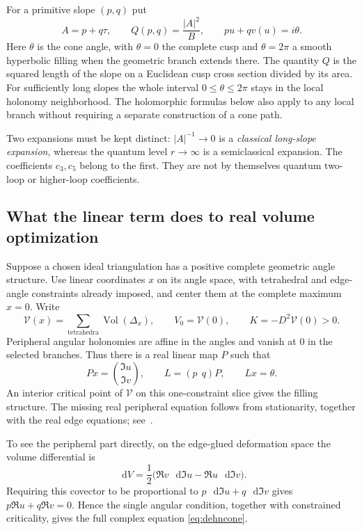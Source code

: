 \documentclass[11pt,a4paper]{article}
\numberwithin{equation}{section}
\theoremstyle{definition}
\theoremstyle{remark}
\DeclareMathOperator{\Vol}{Vol}
\newcommand{\dd}{\mathop{}\!\mathrm d}
\begin{document}
For a primitive slope $(p,q)$ put
\begin{equation}
 A=p+q\tau,\qquad Q(p,q)=\frac{|A|^2}{B},\qquad
 pu+qv(u)=i\theta.
 \label{eq:dehncone}
\end{equation}
Here $\theta$ is the cone angle, with $\theta=0$ the complete cusp
and $\theta=2\pi$ a smooth hyperbolic filling when the geometric
branch extends there. The quantity $Q$ is the squared length of
the slope on a Euclidean cusp cross section divided by its area.
For sufficiently long slopes the whole interval $0\leq\theta\leq2\pi$
stays in the local holonomy neighborhood. The holomorphic formulas
below also apply to any local branch without requiring a separate
construction of a cone path.

Two expansions must be kept distinct: $|A|^{-1}\to0$ is a
\emph{classical long-slope expansion}, whereas the quantum level
$r\to\infty$ is a semiclassical expansion. The coefficients $c_3,c_5$
belong to the first. They are not by themselves quantum two-loop
or higher-loop coefficients.

\subsection{What the linear term does to real volume optimization}

Suppose a chosen ideal triangulation has a positive complete geometric
angle structure. Use linear coordinates $x$ on its angle space,
with tetrahedral and edge-angle constraints already imposed, and center
them at the complete maximum $x=0$. Write
\[
 \mathscr V(x)=\sum_{\text{tetrahedra}}\Vol(\Delta_x),\qquad
 V_0=\mathscr V(0),\qquad K=-D^2\mathscr V(0)>0.
\]
Peripheral angular holonomies are affine in the angles and vanish
at $0$ in the selected branches. Thus there is a real linear map $P$
such that
\[
 Px=\binom{\Im u}{\Im v},\qquad
 L=(p\ \ q)P,\qquad Lx=\theta.
\]
An interior critical point of $\mathscr V$ on this one-constraint
slice gives the filling structure. The missing real peripheral
equation follows from stationarity, together with the real edge
equations; see~\cite[Proposition 5.4 and Theorem 6.1]{FuterGueritaud}.

To see the peripheral part directly, on the edge-glued deformation
space the volume differential is
\begin{equation}
 \dd V=\frac12\bigl(\Re v\,\dd\Im u
                         -\Re u\,\dd\Im v\bigr).
 \label{eq:dehnvolumedifferential}
\end{equation}
Requiring this covector to be proportional to
$p\,\dd\Im u+q\,\dd\Im v$ gives
$p\Re u+q\Re v=0$. Hence the single angular condition, together
with constrained criticality, gives the full complex equation
\eqref{eq:dehncone}.
\end{document}
